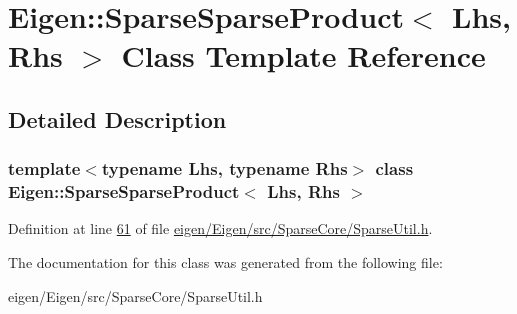 \hypertarget{class_eigen_1_1_sparse_sparse_product}{}\section{Eigen\+:\+:Sparse\+Sparse\+Product$<$ Lhs, Rhs $>$ Class Template Reference}
\label{class_eigen_1_1_sparse_sparse_product}


\subsection{Detailed Description}
\subsubsection*{template$<$typename Lhs, typename Rhs$>$\newline
class Eigen\+::\+Sparse\+Sparse\+Product$<$ Lhs, Rhs $>$}



Definition at line \hyperlink{eigen_2_eigen_2src_2_sparse_core_2_sparse_util_8h_source_l00061}{61} of file \hyperlink{eigen_2_eigen_2src_2_sparse_core_2_sparse_util_8h_source}{eigen/\+Eigen/src/\+Sparse\+Core/\+Sparse\+Util.\+h}.



The documentation for this class was generated from the following file\+:\begin{DoxyCompactItemize}
\item 
eigen/\+Eigen/src/\+Sparse\+Core/\+Sparse\+Util.\+h\end{DoxyCompactItemize}
